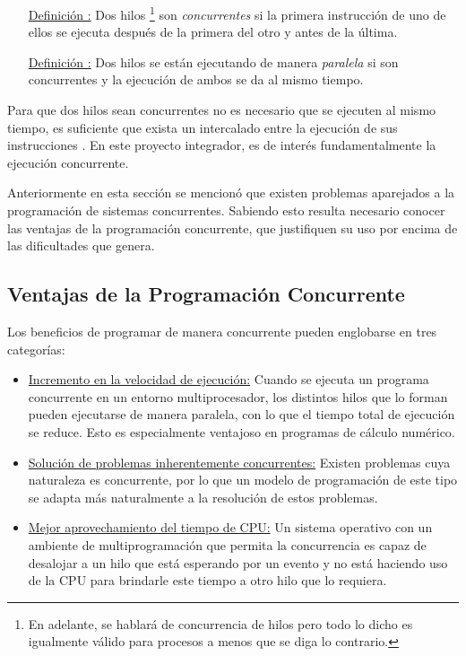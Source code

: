 \begin{itemize}
	\item [\underline{Definición \thedefinitionsCounter :} ] Dos hilos
	\footnote{En adelante, se hablará de concurrencia de hilos pero todo lo dicho
	es igualmente válido para procesos a menos que se diga lo contrario.} son 
	\textit{concurrentes} si la primera instrucción de uno de ellos se ejecuta
	después de la primera del otro y antes de la última.
	\item [\underline{Definición \thedefinitionsCounter :} ] Dos hilos 	se están
	ejecutando de manera \textit{paralela} si son concurrentes y la ejecución de
	ambos se da al mismo tiempo.
\end{itemize}

Para que dos hilos sean concurrentes no es necesario que se ejecuten al mismo
tiempo, es suficiente que exista un intercalado entre la ejecución de sus
instrucciones \cite{PalmaConcurrente}. En este proyecto integrador, es de
interés fundamentalmente la ejecución concurrente.

Anteriormente en esta sección se mencionó que existen problemas aparejados a la
programación de sistemas concurrentes. Sabiendo esto resulta necesario conocer
las ventajas de la programación concurrente, que justifiquen su uso por encima de
las dificultades que genera.

\subsection{Ventajas de la Programación Concurrente}

Los beneficios de programar de manera concurrente pueden englobarse en tres
categorías:

\begin{itemize}
	\item \underline{Incremento en la velocidad de ejecución:} Cuando se ejecuta un
	programa concurrente en un entorno multiprocesador, los distintos hilos que
	lo forman pueden ejecutarse de manera paralela, con lo que el tiempo total de
	ejecución se reduce. Esto es especialmente ventajoso en programas de cálculo
	numérico.
	\item \underline{Solución de problemas inherentemente concurrentes:} Existen
	problemas cuya naturaleza es concurrente, por lo que un modelo de programación
	de este tipo se adapta más naturalmente a la resolución de estos problemas.
	\item \underline{Mejor aprovechamiento del tiempo de CPU:} Un sistema operativo
	con un ambiente de multiprogramación que permita la concurrencia es capaz de
	desalojar a un hilo que está esperando por un evento y no está haciendo uso
	de la CPU para brindarle este tiempo a otro hilo que lo requiera.
\end{itemize}

